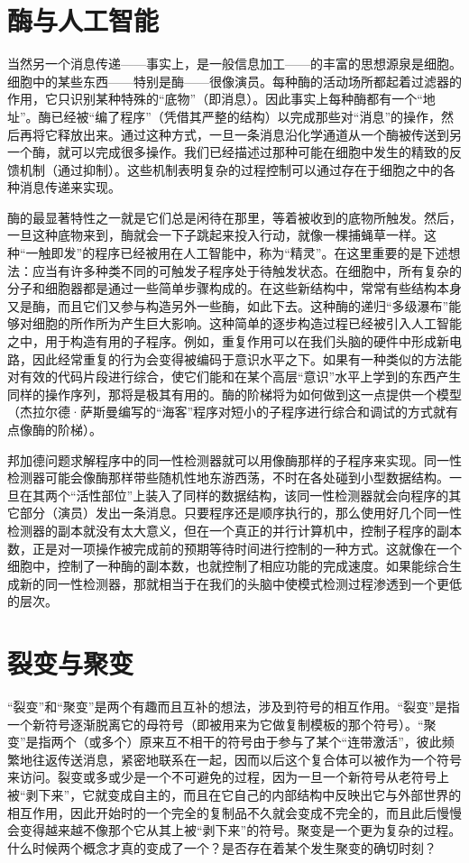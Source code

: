 \section{酶与人工智能}

当然另一个消息传递——事实上，是一般信息加工——的丰富的思想源泉是细胞。细胞中的某些东西——特别是酶——很像演员。每种酶的活动场所都起着过滤器的作用，它只识别某种特殊的“底物”（即消息）。因此事实上每种酶都有一个“地址”。酶已经被“编了程序”（凭借其严整的结构）以完成那些对“消息”的操作，然后再将它释放出来。通过这种方式，一旦一条消息沿化学通道从一个酶被传送到另一个酶，就可以完成很多操作。我们已经描述过那种可能在细胞中发生的精致的反馈机制（通过抑制）。这些机制表明复杂的过程控制可以通过存在于细胞之中的各种消息传递来实现。

酶的最显著特性之一就是它们总是闲待在那里，等着被收到的底物所触发。然后，一旦这种底物来到，酶就会一下子跳起来投入行动，就像一棵捕蝇草一样。这种“一触即发”的程序已经被用在人工智能中，称为“精灵”。在这里重要的是下述想法：应当有许多种类不同的可触发子程序处于待触发状态。在细胞中，所有复杂的分子和细胞器都是通过一些简单步骤构成的。在这些新结构中，常常有些结构本身又是酶，而且它们又参与构造另外一些酶，如此下去。这种酶的递归“多级瀑布”能够对细胞的所作所为产生巨大影响。这种简单的逐步构造过程已经被引入人工智能之中，用于构造有用的子程序。例如，重复作用可以在我们头脑的硬件中形成新电路，因此经常重复的行为会变得被编码于意识水平之下。如果有一种类似的方法能对有效的代码片段进行综合，使它们能和在某个高层“意识”水平上学到的东西产生同样的操作序列，那将是极其有用的。酶的阶梯将为如何做到这一点提供一个模型（杰拉尔德·萨斯曼编写的“海客”程序对短小的子程序进行综合和调试的方式就有点像酶的阶梯）。

邦加德问题求解程序中的同一性检测器就可以用像酶那样的子程序来实现。同一性检测器可能会像酶那样带些随机性地东游西荡，不时在各处碰到小型数据结构。一旦在其两个“活性部位”上装入了同样的数据结构，该同一性检测器就会向程序的其它部分（演员）发出一条消息。只要程序还是顺序执行的，那么使用好几个同一性检测器的副本就没有太大意义，但在一个真正的并行计算机中，控制子程序的副本数，正是对一项操作被完成前的预期等待时间进行控制的一种方式。这就像在一个细胞中，控制了一种酶的副本数，也就控制了相应功能的完成速度。如果能综合生成新的同一性检测器，那就相当于在我们的头脑中使模式检测过程渗透到一个更低的层次。

\section{裂变与聚变}

“裂变”和“聚变”是两个有趣而且互补的想法，涉及到符号的相互作用。“裂变”是指一个新符号逐渐脱离它的母符号（即被用来为它做复制模板的那个符号）。“聚变”是指两个（或多个）原来互不相干的符号由于参与了某个“连带激活”，彼此频繁地往返传送消息，紧密地联系在一起，因而以后这个复合体可以被作为一个符号来访问。裂变或多或少是一个不可避免的过程，因为一旦一个新符号从老符号上被“剥下来”，它就变成自主的，而且在它自己的内部结构中反映出它与外部世界的相互作用，因此开始时的一个完全的复制品不久就会变成不完全的，而且此后慢慢会变得越来越不像那个它从其上被“剥下来”的符号。聚变是一个更为复杂的过程。什么时候两个概念才真的变成了一个？是否存在着某个发生聚变的确切时刻？

